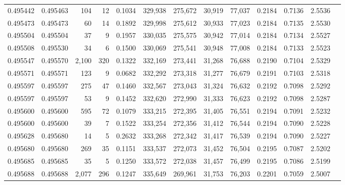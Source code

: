 \begin{tabular}{rrrrrrrrrrrrr}
0.495442 & 0.495463 &   104 &    12 &                                     0.1034 & 329,938 & 275,672 &  30,919 &  77,037 & 0.2184 & 0.7136 & 2.5536 \\
0.495473 & 0.495473 &    60 &    14 &                                     0.1892 & 329,998 & 275,612 &  30,933 &  77,023 & 0.2184 & 0.7135 & 2.5530 \\
0.495504 & 0.495504 &    37 &     9 &                                     0.1957 & 330,035 & 275,575 &  30,942 &  77,014 & 0.2184 & 0.7134 & 2.5527 \\
0.495508 & 0.495530 &    34 &     6 &                                     0.1500 & 330,069 & 275,541 &  30,948 &  77,008 & 0.2184 & 0.7133 & 2.5523 \\
0.495547 & 0.495570 & 2,100 &   320 &                                     0.1322 & 332,169 & 273,441 &  31,268 &  76,688 & 0.2190 & 0.7104 & 2.5329 \\
0.495571 & 0.495571 &   123 &     9 &                                     0.0682 & 332,292 & 273,318 &  31,277 &  76,679 & 0.2191 & 0.7103 & 2.5318 \\
0.495597 & 0.495597 &   275 &    47 &                                     0.1460 & 332,567 & 273,043 &  31,324 &  76,632 & 0.2192 & 0.7098 & 2.5292 \\
0.495597 & 0.495597 &    53 &     9 &                                     0.1452 & 332,620 & 272,990 &  31,333 &  76,623 & 0.2192 & 0.7098 & 2.5287 \\
0.495600 & 0.495600 &   595 &    72 &                                     0.1079 & 333,215 & 272,395 &  31,405 &  76,551 & 0.2194 & 0.7091 & 2.5232 \\
0.495600 & 0.495600 &    39 &     7 &                                     0.1522 & 333,254 & 272,356 &  31,412 &  76,544 & 0.2194 & 0.7090 & 2.5228 \\
0.495628 & 0.495680 &    14 &     5 &                                     0.2632 & 333,268 & 272,342 &  31,417 &  76,539 & 0.2194 & 0.7090 & 2.5227 \\
0.495680 & 0.495680 &   269 &    35 &                                     0.1151 & 333,537 & 272,073 &  31,452 &  76,504 & 0.2195 & 0.7087 & 2.5202 \\
0.495685 & 0.495685 &    35 &     5 &                                     0.1250 & 333,572 & 272,038 &  31,457 &  76,499 & 0.2195 & 0.7086 & 2.5199 \\
0.495688 & 0.495688 & 2,077 &   296 &                                     0.1247 & 335,649 & 269,961 &  31,753 &  76,203 & 0.2201 & 0.7059 & 2.5007 \\

\end{tabular}
